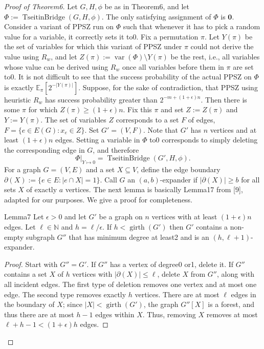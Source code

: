 \begin{proof}[Proof of Theorem6]
Let $G,H,\phi$ be as in Theorem6, and let $\Phi:=\operatorname{TseitinBridge}(G,H,\phi)$. The only satisfying assignment of $\Phi$ is $\mathbf0$. Consider a variant of PPSZ run on $\Phi$ such that whenever it has to pick a random value for a variable, it correctly sets it to0. Fix a permutation $\pi$. Let $Y(\pi)$ be the set of variables for which this variant of PPSZ under $\pi$ could not derive the value using $R_w$, and let $Z(\pi):=\operatorname{var}(\Phi)\setminus Y(\pi)$ be the rest, i.e., all variables whose value can be derived using $R_w$ once all variables before them in $\pi$ are set to0. It is not difficult to see that the success probability of the actual PPSZ on $\Phi$ is exactly $\mathbb E_\pi[2^{-|Y(\pi)|}]$.
Suppose, for the sake of contradiction, that PPSZ using heuristic $R_w$ has success probability greater than $2^{-m+(1+\epsilon)n}$. Then there is some $\pi$ for which $Z(\pi)\ge(1+\epsilon)n$. Fix this $\pi$ and set $Z:=Z(\pi)$ and $Y:=Y(\pi)$. The set of variables $Z$ corresponds to a set $F$ of edges, $F=\{e\in E(G):x_e\in Z\}$. Set $G'=(V,F)$. Note that $G'$ has $n$ vertices and at least $(1+\epsilon)n$ edges. Setting a variable in $\Phi$ to0 corresponds to simply deleting the corresponding edge in $G$, and therefore
\[
\Phi|_{Y\mapsto0}=\operatorname{TseitinBridge}(G',H,\phi).
\]
For a graph $G=(V,E)$ and a set $X\subseteq V$, define the edge boundary $\partial(X):=\{e\in E:|e\cap X|=1\}$. Call $G$ an $(a,b)$-expander if $|\partial(X)|\ge b$ for all sets $X$ of exactly $a$ vertices. The next lemma is basically Lemma17 from [9], adapted for our purposes. We give a proof for completeness.
\begin{authorclaim}{Lemma7}
Let $\epsilon>0$ and let $G'$ be a graph on $n$ vertices with at least $(1+\epsilon)n$ edges. Let $\ell\in\mathbb N$ and $h=\ell/\epsilon$. If $h<\operatorname{girth}(G')$ then $G'$ contains a non-empty subgraph $G''$ that has minimum degree at least2 and is an $(h,\ell+1)$-expander.
\end{authorclaim}
\begin{proof}
Start with $G''=G'$. If $G''$ has a vertex of degree0 or1, delete it. If $G''$ contains a set $X$ of $h$ vertices with $|\partial(X)|\le\ell$, delete $X$ from $G''$, along with all incident edges.
The first type of deletion removes one vertex and at most one edge. The second type removes exactly $h$ vertices. There are at most $\ell$ edges in the boundary of $X$; since $|X|<\operatorname{girth}(G')$, the graph $G''[X]$ is a forest, and thus there are at most $h-1$ edges within $X$. Thus, removing $X$ removes at most $\ell+h-1<(1+\epsilon)h$ edges.

\end{proof}
\end{proof}
